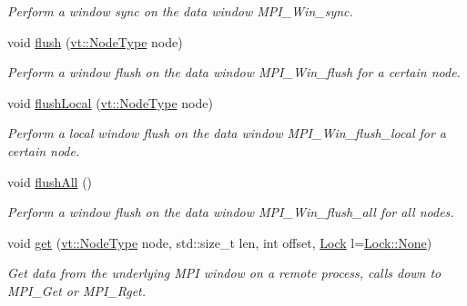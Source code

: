 \begin{DoxyCompactItemize}
\begin{DoxyCompactList}\small\item\em Perform a window sync on the data window {\ttfamily M\+P\+I\+\_\+\+Win\+\_\+sync}. \end{DoxyCompactList}\item 
void \hyperlink{structvt_1_1rdma_1_1_handle_3_01_t_00_01_e_00_01_index_t_00_01typename_01std_1_1enable__if__t_3_d15dac1b5db6e2bc0fb0b8aca42b1456_a14d0274de1ef9b44f57e34caa57161f7}{flush} (\hyperlink{namespacevt_a866da9d0efc19c0a1ce79e9e492f47e2}{vt\+::\+Node\+Type} node)
\begin{DoxyCompactList}\small\item\em Perform a window flush on the data window {\ttfamily M\+P\+I\+\_\+\+Win\+\_\+flush} for a certain node. \end{DoxyCompactList}\item 
void \hyperlink{structvt_1_1rdma_1_1_handle_3_01_t_00_01_e_00_01_index_t_00_01typename_01std_1_1enable__if__t_3_d15dac1b5db6e2bc0fb0b8aca42b1456_a4e007e895ee92570468dddc3db749abb}{flush\+Local} (\hyperlink{namespacevt_a866da9d0efc19c0a1ce79e9e492f47e2}{vt\+::\+Node\+Type} node)
\begin{DoxyCompactList}\small\item\em Perform a local window flush on the data window {\ttfamily M\+P\+I\+\_\+\+Win\+\_\+flush\+\_\+local} for a certain node. \end{DoxyCompactList}\item 
void \hyperlink{structvt_1_1rdma_1_1_handle_3_01_t_00_01_e_00_01_index_t_00_01typename_01std_1_1enable__if__t_3_d15dac1b5db6e2bc0fb0b8aca42b1456_a93c57cb5e94d8421447898c079f21d77}{flush\+All} ()
\begin{DoxyCompactList}\small\item\em Perform a window flush on the data window {\ttfamily M\+P\+I\+\_\+\+Win\+\_\+flush\+\_\+all} for all nodes. \end{DoxyCompactList}\item 
void \hyperlink{structvt_1_1rdma_1_1_handle_3_01_t_00_01_e_00_01_index_t_00_01typename_01std_1_1enable__if__t_3_d15dac1b5db6e2bc0fb0b8aca42b1456_a48a2d3e6af45dd8cad201db0eec2d7c2}{get} (\hyperlink{namespacevt_a866da9d0efc19c0a1ce79e9e492f47e2}{vt\+::\+Node\+Type} node, std\+::size\+\_\+t len, int offset, \hyperlink{namespacevt_1_1rdma_ac5c20b41a653e520b6305d4d454ecb70}{Lock} l=\hyperlink{namespacevt_1_1rdma_ac5c20b41a653e520b6305d4d454ecb70a6adf97f83acf6453d4a6a4b1070f3754}{Lock\+::\+None})
\begin{DoxyCompactList}\small\item\em Get data from the underlying M\+PI window on a remote process, calls down to {\ttfamily M\+P\+I\+\_\+\+Get} or {\ttfamily M\+P\+I\+\_\+\+Rget}. \end{DoxyCompactList}\item 

\end{DoxyCompactItemize}
